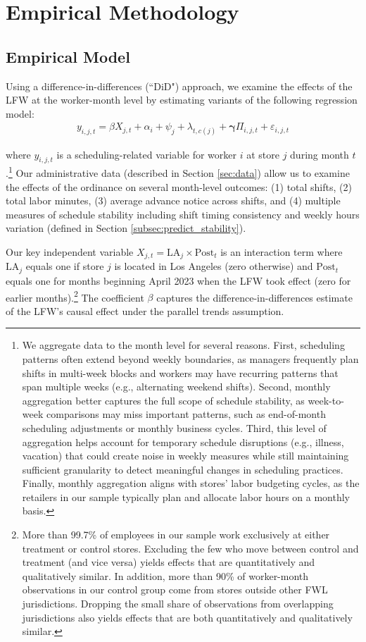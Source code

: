 \documentclass[letterpaper,11pt,leqno]{article}
\theoremstyle{paper}
\begin{document}
\section{Empirical Methodology} \label{sec:ident_strat}

\subsection{Empirical Model}
Using a difference-in-differences (``DiD") approach, we examine the effects of the LFW at the worker-month level by estimating variants of the following regression model:
\begin{align}
y_{i,j,t} = \beta X_{j,t} +  \alpha_{i} + \psi_j +  \lambda_{t, c(j)} +  \bm{\gamma}\Pi_{i,j,t} + \varepsilon_{i,j,t} \label{eq:model}
\end{align}

where $y_{i,j,t}$ is a scheduling-related variable for worker $i$ at store $j$ during month $t$.\footnote{We aggregate data to the month level for several reasons. First, scheduling patterns often extend beyond weekly boundaries, as managers frequently plan shifts in multi-week blocks and workers may have recurring patterns that span multiple weeks (e.g., alternating weekend shifts). Second, monthly aggregation better captures the full scope of schedule stability, as week-to-week comparisons may miss important patterns, such as end-of-month scheduling adjustments or monthly business cycles. Third, this level of aggregation helps account for temporary schedule disruptions (e.g., illness, vacation) that could create noise in weekly measures while still maintaining sufficient granularity to detect meaningful changes in scheduling practices. Finally, monthly aggregation aligns with stores' labor budgeting cycles, as the retailers in our sample typically plan and allocate labor hours on a monthly basis.} Our administrative data (described in Section \ref{sec:data}) allow us to examine the effects of the ordinance on several month-level outcomes: (1) total shifts, (2) total labor minutes, (3) average advance notice across shifts, and (4) multiple measures of schedule stability including shift timing consistency and weekly hours variation (defined in Section \ref{subsec:predict_stability}).

Our key independent variable $X_{j,t} = \text{LA}_{j} \times \text{Post}_{t}$ is an interaction term where $\text{LA}_{j}$ equals one if store $j$ is located in Los Angeles (zero otherwise) and $\text{Post}_{t}$ equals one for months beginning April 2023 when the LFW took effect (zero for earlier months).\footnote{More than 99.7\% of employees in our sample work exclusively at either treatment or control stores. Excluding the few who move between control and treatment (and vice versa) yields effects that are quantitatively and qualitatively similar. In addition, more than 90\% of worker-month observations in our control group come from stores outside other FWL jurisdictions. Dropping the small share of observations from overlapping jurisdictions also yields effects that are both quantitatively and qualitatively similar.} The coefficient $\beta$ captures the difference-in-differences estimate of the LFW's causal effect under the parallel trends assumption.
\end{document}

